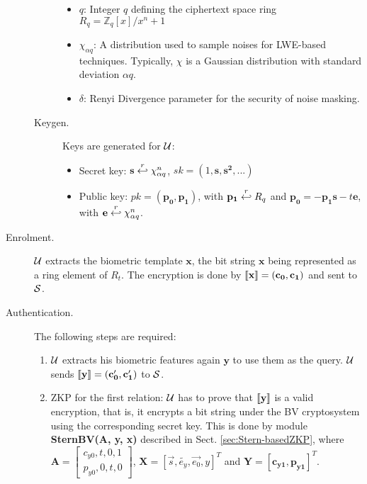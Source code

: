 \begin{description}
\begin{description}
\begin{itemize}
    \item $q$: Integer $q$ defining the ciphertext space ring
      $R_q = \mathbb{Z}_q[x]/x^n+1$
    \item $\chi_{\alpha q}$: A distribution used to sample noises for LWE-based
      techniques.  Typically, $\chi$ is a Gaussian distribution with standard
      deviation $\alpha q$.
    \item \(\delta\): Renyi Divergence parameter for the security of noise
      masking.
    \end{itemize}
  \item[Keygen.] Keys are generated for $\mathcal{U}$:
    \begin{itemize}
    \item Secret key: $\mathbf{s} \stackrel{r}{\hookleftarrow} \chi_{\alpha q}^n$,
      \(sk = (1, \mathbf{s, s^{2}, ...})\)
    \item Public key: $pk = \mathbf{(p_0,p_1)}$, with
      $\mathbf{p_1} \stackrel{r}{\hookleftarrow} R_q$ and
      $\mathbf{p_0} = -\mathbf{p_1s} - t\mathbf{e}$, with
      $\mathbf{e} \stackrel{r}{\hookleftarrow} \chi_{\alpha q}^n$.
    \end{itemize}
  \end{description}
\item [Enrolment.] $\mathcal{U}$ extracts the biometric template $\mathbf{x}$, the bit
  string $\mathbf{x}$ being represented as a ring element of ${R}_t$.  The
  encryption is done by $\left\llbracket\mathbf{x}\right\rrbracket = (\mathbf{c_0},\mathbf{c_1})$ and
  sent to $\mathcal{S}$.
\item [Authentication.] The following steps are required:
  \begin{enumerate}
  \item $\mathcal{U}$ extracts his biometric features again $\mathbf{y}$ to use them
    as the query. $\mathcal{U}$ sends $\left\llbracket\mathbf{y}\right\rrbracket = (\mathbf{c_0', c_1'})$ to
    $\mathcal{S}$.
  \item ZKP for the first relation: $\mathcal{U}$ has to prove that $\left\llbracket\mathbf{y}\right\rrbracket$
    is a valid encryption, that is, it encrypts a bit string under the BV
    cryptosystem using the corresponding secret key. This is done by module
    \textbf{SternBV(A, y, x)} described in Sect. \ref{sec:Stern-basedZKP}, where
    $\mathbf{A} = \begin{bmatrix} c_{y0}, t, 0, 1\\p_{y0}, 0, t, 0
    \end{bmatrix}$, \(\mathbf{X} = [\vec{s},\tilde{e_{y}},\vec{e_{0}},y]^T\) and \(\mathbf{Y
    = [c_{y1},p_{y1}]}^{T}\).


\end{enumerate}
\end{description}
